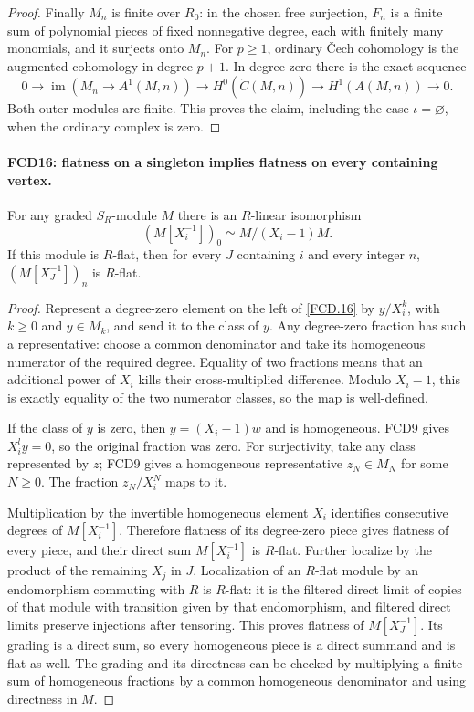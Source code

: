 \begin{proof}
Finally $M_n$ is finite over $R_0$: in the chosen free surjection,
$F_n$ is a finite sum of polynomial pieces of fixed nonnegative
degree, each with finitely many monomials, and it surjects onto
$M_n$.  For $p\ge1$, ordinary \v Cech cohomology is the
augmented cohomology in degree $p+1$.  In degree zero there is
the exact sequence
\[
 0\longrightarrow\operatorname{im}(M_n\to A^1(M,n))
 \longrightarrow H^0(\check C(M,n))
 \longrightarrow H^1(A(M,n))\longrightarrow0.
\]
Both outer modules are finite.  This proves the claim, including
the case $\iota=\varnothing$, when the ordinary complex is zero.
\end{proof}

\paragraph{FCD16: flatness on a singleton implies flatness on every containing vertex.}
\label{claim:FCD16}
For any graded $S_R$-module $M$ there is an $R$-linear
isomorphism
\[
 (M[X_i^{-1}])_0\simeq M/(X_i-1)M.                  \tag{FCD.16}\label{FCD.16}
\]
If this module is $R$-flat, then for every $J$ containing $i$
and every integer $n$, $(M[X_J^{-1}])_n$ is $R$-flat.

\begin{proof}
Represent a degree-zero element on the left of \eqref{FCD.16}
by $y/X_i^k$, with $k\ge0$ and $y\in M_k$, and send it to
the class of $y$.  Any degree-zero fraction has such a
representative: choose a common denominator and take its
homogeneous numerator of the required degree.  Equality of two
fractions means that an additional power of $X_i$ kills their
cross-multiplied difference.  Modulo $X_i-1$, this is exactly
equality of the two numerator classes, so the map is well-defined.

If the class of $y$ is zero, then $y=(X_i-1)w$ and is
homogeneous.  FCD9 gives $X_i^ly=0$, so the original fraction
was zero.  For surjectivity, take any class represented by $z$;
FCD9 gives a homogeneous representative $z_N\in M_N$ for
some $N\ge0$.  The fraction $z_N/X_i^N$ maps to it.

Multiplication by the invertible homogeneous element $X_i$
identifies consecutive degrees of $M[X_i^{-1}]$.
Therefore flatness of its degree-zero piece gives flatness of
every piece, and their direct sum $M[X_i^{-1}]$ is $R$-flat.
Further localize by the product of the remaining $X_j$ in $J$.
Localization of an $R$-flat module by an endomorphism commuting
with $R$ is $R$-flat: it is the filtered direct limit of copies
of that module with transition given by that endomorphism, and
filtered direct limits preserve injections after tensoring.
This proves flatness of $M[X_J^{-1}]$.
Its grading is a direct sum, so every homogeneous piece is a
direct summand and is flat as well.  The grading and its directness
can be checked by multiplying a finite sum of homogeneous fractions
by a common homogeneous denominator and using directness in $M$.
\end{proof}

